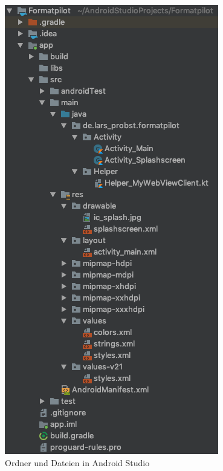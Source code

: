 \begin{figure}[h]
    \centering
    \includegraphics[scale=0.4]{images/kapitel_4/android_folder.png}
    \caption{Ordner und Dateien in Android Studio}
    \label{fig:umsetzung_android_folder}
\end{figure}

